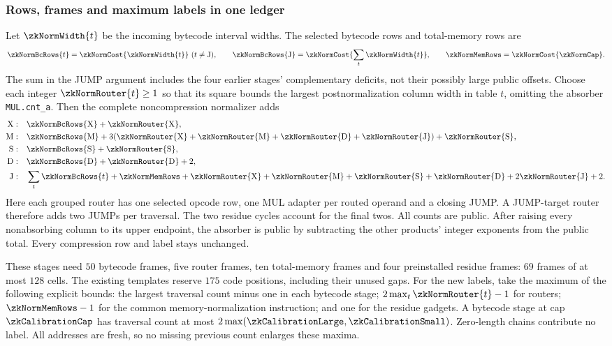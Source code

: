 \subsubsection{Rows, frames and maximum labels in one ledger}

Let $\zkNormWidth{t}$ be the incoming bytecode interval widths. The selected bytecode rows and total-memory rows are
\[
 \zkNormBcRows{t}=\zkNormCost{\zkNormWidth{t}}\ (t\ne\mathrm J),
 \qquad
 \zkNormBcRows{\mathrm J}=\zkNormCost{\sum_t\zkNormWidth{t}},
 \qquad
 \zkNormMemRows=\zkNormCost{\zkNormCap}.
\]
The sum in the JUMP argument includes the four earlier stages' complementary deficits, not their possibly large public offsets. Choose each integer $\zkNormRouter{t}\ge1$ so that its square bounds the largest postnormalization column width in table $t$, omitting the absorber \texttt{MUL.cnt\_a}. Then the complete noncompression normalizer adds
\[
\begin{aligned}
 \mathrm X:&\quad \zkNormBcRows{\mathrm X}+\zkNormRouter{\mathrm X},\\
 \mathrm M:&\quad \zkNormBcRows{\mathrm M}
  +3(\zkNormRouter{\mathrm X}+\zkNormRouter{\mathrm M}+\zkNormRouter{\mathrm D}+\zkNormRouter{\mathrm J})+\zkNormRouter{\mathrm S},\\
 \mathrm S:&\quad \zkNormBcRows{\mathrm S}+\zkNormRouter{\mathrm S},\\
 \mathrm D:&\quad \zkNormBcRows{\mathrm D}+\zkNormRouter{\mathrm D}+2,\\
 \mathrm J:&\quad \sum_t\zkNormBcRows{t}+\zkNormMemRows
  +\zkNormRouter{\mathrm X}+\zkNormRouter{\mathrm M}+\zkNormRouter{\mathrm S}
  +\zkNormRouter{\mathrm D}+2\zkNormRouter{\mathrm J}+2.
\end{aligned}
\]
Here each grouped router has one selected opcode row, one MUL adapter per routed operand and a closing JUMP. A JUMP-target router therefore adds two JUMPs per traversal. The two residue cycles account for the final twos. All counts are public. After raising every nonabsorbing column to its upper endpoint, the absorber is public by subtracting the other products' integer exponents from the public total. Every compression row and label stays unchanged.

These stages need $50$ bytecode frames, five router frames, ten total-memory frames and four preinstalled residue frames: $69$ frames of at most $128$ cells. The existing templates reserve $175$ code positions, including their unused gaps. For the new labels, take the maximum of the following explicit bounds: the largest traversal count minus one in each bytecode stage; $2\max_t\zkNormRouter{t}-1$ for routers; $\zkNormMemRows-1$ for the common memory-normalization instruction; and one for the residue gadgets. A bytecode stage at cap $\zkCalibrationCap$ has traversal count at most $2\max(\zkCalibrationLarge,\zkCalibrationSmall)$. Zero-length chains contribute no label. All addresses are fresh, so no missing previous count enlarges these maxima.

